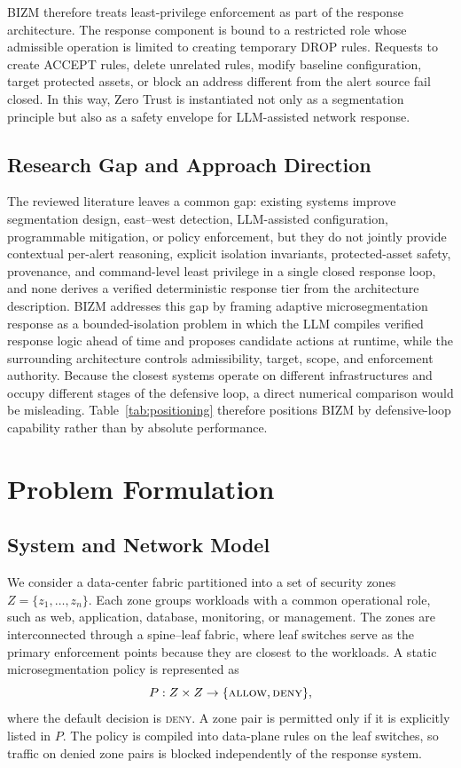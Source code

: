 \documentclass[final,5p]{elsarticle}
\begin{document}
BIZM therefore treats least-privilege enforcement as part of the response architecture. The response component is bound to a restricted role whose admissible operation is limited to creating temporary DROP rules. Requests to create ACCEPT rules, delete unrelated rules, modify baseline configuration, target protected assets, or block an address different from the alert source fail closed. In this way, Zero Trust is instantiated not only as a segmentation principle but also as a safety envelope for LLM-assisted network response.

\subsection{Research Gap and Approach Direction}
\label{sec:rw_gap}

The reviewed literature leaves a common gap: existing systems improve segmentation design, east--west detection, LLM-assisted configuration, programmable mitigation, or policy enforcement, but they do not jointly provide contextual per-alert reasoning, explicit isolation invariants, protected-asset safety, provenance, and command-level least privilege in a single closed response loop, and none derives a verified deterministic response tier from the architecture description. BIZM addresses this gap by framing adaptive microsegmentation response as a bounded-isolation problem in which the LLM compiles verified response logic ahead of time and proposes candidate actions at runtime, while the surrounding architecture controls admissibility, target, scope, and enforcement authority. Because the closest systems operate on different infrastructures and occupy different stages of the defensive loop, a direct numerical comparison would be misleading. Table~\ref{tab:positioning} therefore positions BIZM by defensive-loop capability rather than by absolute performance.

\section{Problem Formulation}
\label{sec:problem}

\subsection{System and Network Model}
\label{sec:system_model}

We consider a data-center fabric partitioned into a set of security zones $Z=\{z_1,\ldots,z_n\}$. Each zone groups workloads with a common operational role, such as web, application, database, monitoring, or management. The zones are interconnected through a spine--leaf fabric, where leaf switches serve as the primary enforcement points because they are closest to the workloads. A static microsegmentation policy is represented as
\[
P: Z \times Z \rightarrow \{\textsc{allow},\textsc{deny}\},
\]
where the default decision is \textsc{deny}. A zone pair is permitted only if it is explicitly listed in $P$. The policy is compiled into data-plane rules on the leaf switches, so traffic on denied zone pairs is blocked independently of the response system.
\end{document}
